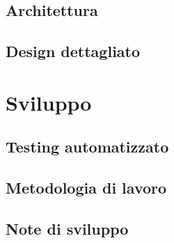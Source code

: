 \documentclass[a4paper, italian, 11pt, oneside]{report}
\begin{document}
\section{Architettura}

\section{Design dettagliato}






\chapter{Sviluppo}

\section{Testing automatizzato}

\section{Metodologia di lavoro}

\section{Note di sviluppo}
\end{document}
